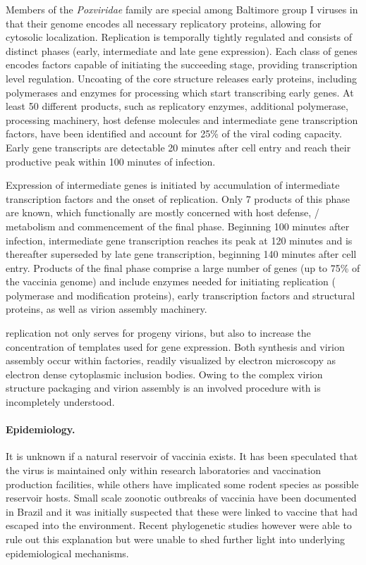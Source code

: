 Members of the \textit{Poxviridae} family are special among Baltimore group I viruses in that their genome encodes all necessary replicatory proteins, allowing for cytosolic localization. Replication is temporally tightly regulated and consists of distinct phases (early, intermediate and late gene expression). Each class of genes encodes factors capable of initiating the succeeding stage, providing transcription level regulation. Uncoating of the core structure releases early proteins, including  polymerases and enzymes for  processing which start transcribing early genes. At least 50 different products, such as  replicatory enzymes, additional  polymerase,  processing machinery, host defense molecules and intermediate gene transcription factors, have been identified and account for 25\% of the viral coding capacity. Early gene transcripts are detectable 20 minutes after cell entry and reach their productive peak within 100 minutes of infection.

Expression of intermediate genes is initiated by accumulation of intermediate  transcription factors and the onset of  replication. Only 7 products of this phase are known, which functionally are mostly concerned with host defense, \slash {} metabolism and commencement of the final phase. Beginning 100 minutes after infection, intermediate gene transcription reaches its peak at 120 minutes and is thereafter superseded by late gene transcription, beginning 140 minutes after cell entry. Products of the final phase comprise a large number of genes (up to 75\% of the vaccinia genome) and include enzymes needed for initiating replication ( polymerase and modification proteins), early transcription factors and structural proteins, as well as virion assembly machinery.

 replication not only serves for progeny virions, but also to increase the concentration of templates used for gene expression. Both  synthesis and virion assembly occur within factories, readily visualized by electron microscopy as electron dense cytoplasmic inclusion bodies. Owing to the complex virion structure  packaging and virion assembly is an involved procedure with is incompletely understood.

\paragraph{Epidemiology.}
It is unknown if a natural reservoir of vaccinia exists. It has been speculated that the virus is maintained only within research laboratories and vaccination production facilities, while others have implicated some rodent species as possible reservoir hosts. Small scale zoonotic outbreaks of vaccinia have been documented in Brazil and it was initially suspected that these were linked to vaccine that had escaped into the environment. Recent phylogenetic studies however were able to rule out this explanation but were unable to shed further light into underlying epidemiological mechanisms.


